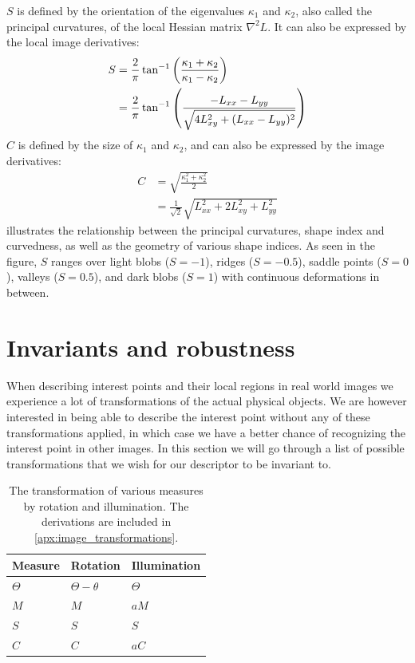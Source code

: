 \documentclass[thesis.tex]{subfiles}
\begin{document}
$S$ is defined by the orientation of the eigenvalues $\kappa_1$ and $\kappa_2$, also called the principal curvatures, of the local Hessian matrix $\nabla^2 L$. It can also be expressed by the local image derivatives:
%
\begin{align}
S &= \frac{2}{\pi} \tan^{-1} \left( \frac{\kappa_1 + \kappa_2}{\kappa_1 - \kappa_2} \right) \\
&= \frac{2}{\pi} \tan^{-1} \left( \frac{-L_{xx} - L_{yy}}{\sqrt{4 L_{xy}^2 + (L_{xx} - L_{yy})^2}} \right)
\end{align}
%
$C$ is defined by the size of $\kappa_1$ and $\kappa_2$, and can also be expressed by the image derivatives:
%
\begin{align}
C &= \sqrt{\frac{\kappa_1^2 + \kappa_2^2}{2}} \\
&= \frac{1}{\sqrt2} \sqrt{L_{xx}^2 + 2 L_{xy}^2 + L_{yy}^2}
\end{align}
%
 illustrates the relationship between the principal curvatures, shape index and curvedness, as well as the geometry of various shape indices. As seen in the figure, $S$ ranges over light blobs ($S = -1$), ridges ($S = -0.5$), saddle points ($S = 0$), valleys ($S = 0.5$), and dark blobs ($S = 1$) with continuous deformations in between.
%
\section{Invariants and robustness}
When describing interest points and their local regions in real world images we experience a lot of transformations of the actual physical objects. We are however interested in being able to describe the interest point without any of these transformations applied, in which case we have a better chance of recognizing the interest point in other images. In this section we will go through a list of possible transformations that we wish for our descriptor to be invariant to.


\begin{table}[H]
\centering
\begin{tabular}{@{}l|ll@{}}
Measure & Rotation & Illumination \\
\hline
$\Theta$ & $\Theta - \theta $ & $\Theta$ \\
$M$ & $M$ & $a M$ \\
$S$ & $S$ & $S$ \\
$C$ & $C$ & $a C$ \\
\end{tabular}
\caption{The transformation of various measures by rotation and illumination. The derivations are included in \cref{apx:image_transformations}.}
\end{table}
\end{document}
